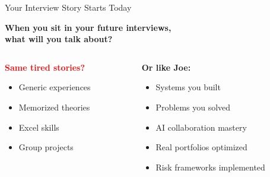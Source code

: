 \documentclass[aspectratio=169,12pt]{beamer}
\begin{document}
\begin{frame}{Your Interview Story Starts Today}
\begin{center}
\large
\textbf{When you sit in your future interviews,\\
what will you talk about?}
\end{center}

\vspace{0.3cm}
\begin{columns}
\begin{column}{0.5\textwidth}
\textcolor{red}{\textbf{Same tired stories?}}
\small
\begin{itemize}
\item Generic experiences
\item Memorized theories
\item Excel skills
\item Group projects
\end{itemize}
\end{column}
\begin{column}{0.5\textwidth}
\textcolor{successgreen}{\textbf{Or like Joe:}}
\small
\begin{itemize}
\item Systems you built
\item Problems you solved
\item AI collaboration mastery
\item Real portfolios optimized
\item Risk frameworks implemented
\end{itemize}
\end{column}
\end{columns}
\end{frame}
\end{document}
